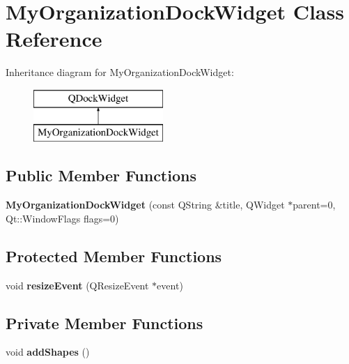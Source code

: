 \hypertarget{class_my_organization_dock_widget}{}\section{My\+Organization\+Dock\+Widget Class Reference}
\label{class_my_organization_dock_widget}
Inheritance diagram for My\+Organization\+Dock\+Widget\+:\begin{figure}[H]
\begin{center}
\leavevmode
\includegraphics[height=2.000000cm]{class_my_organization_dock_widget}
\end{center}
\end{figure}
\subsection*{Public Member Functions}
\begin{DoxyCompactItemize}
\item 
\hypertarget{class_my_organization_dock_widget_aac6c63cd09ef063f95872800c400666a}{}{\bfseries My\+Organization\+Dock\+Widget} (const Q\+String \&title, Q\+Widget $\ast$parent=0, Qt\+::\+Window\+Flags flags=0)\label{class_my_organization_dock_widget_aac6c63cd09ef063f95872800c400666a}

\end{DoxyCompactItemize}
\subsection*{Protected Member Functions}
\begin{DoxyCompactItemize}
\item 
\hypertarget{class_my_organization_dock_widget_ae2e820b68075f26923adc4b8ff972d1d}{}void {\bfseries resize\+Event} (Q\+Resize\+Event $\ast$event)\label{class_my_organization_dock_widget_ae2e820b68075f26923adc4b8ff972d1d}

\end{DoxyCompactItemize}
\subsection*{Private Member Functions}
\begin{DoxyCompactItemize}
\item 
\hypertarget{class_my_organization_dock_widget_a238a2af18095392137ec5a4482304e01}{}void {\bfseries add\+Shapes} ()\label{class_my_organization_dock_widget_a238a2af18095392137ec5a4482304e01}

\end{DoxyCompactItemize}
